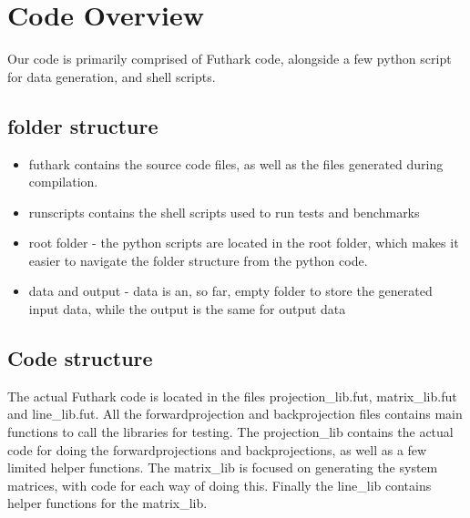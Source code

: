 \section{Code Overview}
Our code is primarily comprised of Futhark code, alongside a few python script for data generation, and shell scripts.

\subsection{folder structure}
\begin{itemize}
  \item futhark contains the source code files, as well as the files generated during compilation.
  \item runscripts contains the shell scripts used to run tests and benchmarks
  \item root folder - the python scripts are located in the root folder, which makes it easier to navigate the folder structure from the python code.
  \item data and output - data is an, so far, empty folder to store the generated input data, while the output is the same for output data
\end{itemize}

\subsection{Code structure}
The actual Futhark code is located in the files projection\_lib.fut, matrix\_lib.fut and line\_lib.fut. All the forwardprojection and backprojection files contains main functions to call the libraries for testing. The projection\_lib contains the actual code for doing the forwardprojections and backprojections, as well as a few limited helper functions. The matrix\_lib is focused on generating the system matrices, with code for each way of doing this. Finally the line\_lib contains helper functions for the matrix\_lib.
